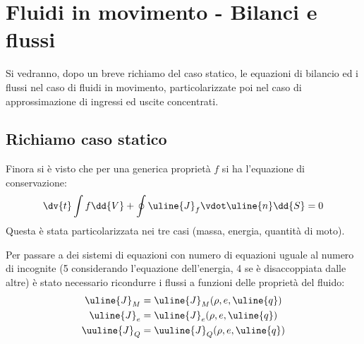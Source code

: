 %
\section{Fluidi in movimento - Bilanci e flussi}
Si vedranno, dopo un breve richiamo del caso statico, le equazioni di bilancio ed i flussi nel caso di fluidi in movimento, particolarizzate poi nel caso di approssimazione di ingressi ed uscite concentrati.

\subsection{Richiamo caso statico}
Finora si è visto che per una generica proprietà $f$ si ha l'equazione di conservazione:
%
	\begin{equation*}
		\dv{t} \int f \dd{V} + \oint \uline{J}_f \vdot \uline{n} \dd{S} = 0
	\end{equation*} 
%
Questa è stata particolarizzata nei tre casi (massa, energia, quantità di moto). 

Per passare a dei sistemi di equazioni con numero di equazioni uguale al numero di incognite (5 considerando l'equazione dell'energia, 4 se è disaccoppiata dalle altre) è stato necessario ricondurre i flussi a funzioni delle proprietà del fluido:
%
	\begin{equation*}
		\begin{gathered}
			\uline{J}_M = \uline{J}_M (\rho, e, \uline{q}) \\
			\uline{J}_e = \uline{J}_e (\rho, e, \uline{q}) \\
			\uuline{J}_Q = \uuline{J}_Q (\rho, e, \uline{q}) 
		\end{gathered}
	\end{equation*}
%

